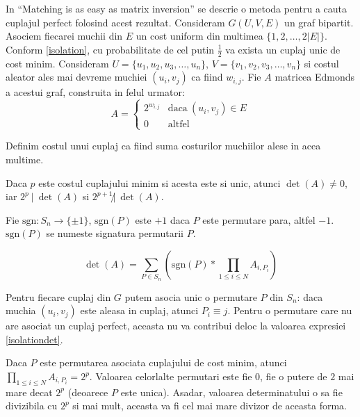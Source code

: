 In ``Matching is as easy as matrix inversion'' \cite{matchingezmatrix} se
descrie o metoda pentru a cauta cuplajul perfect folosind acest rezultat.
Consideram $G(U, V, E)$ un graf bipartit. Asociem fiecarei muchii din $E$ un
cost uniform din multimea $\{1, 2, \ldots, 2|E|\}$. Conform \ref{isolation}, cu
probabilitate de cel putin $\frac{1}{2}$ va exista un cuplaj unic de cost minim.
Consideram $U = \{u_{1}, u_{2}, u_{3}, \ldots, u_{n}\}$,
$V = \{v_{1}, v_{2}, v_{3}, \ldots, v_{n}\}$ si costul aleator ales mai devreme muchiei
$(u_{i}, v_{j})$ ca fiind $w_{i,j}$. Fie $A$ matricea Edmonds a acestui
graf, construita in felul urmator:
\begin{equation}
A=
\begin{cases}
  2^{w_{i,j}} & \text{daca}\ (u_{i}, v_{j}) \in E \\
  0 & \text{altfel}
\end{cases}
\end{equation}

Definim costul unui cuplaj ca fiind suma costurilor muchiilor alese in acea multime.
\begin{lem}
  Daca $p$ este costul cuplajului minim si acesta este si unic, atunci $\det(A) \neq 0$, iar
  $2^{p} \ |\ \det(A)$ si $2^{p+1} \not| \ \det(A)$.
\end{lem}

Fie $\text{sgn} : S_{n} \to \{\pm 1\}$, $\text{sgn}(P)$ este $+1$ daca $P$
este permutare para, altfel $-1$. $\text{sgn}(P)$ se numeste signatura
permutarii $P$.

\begin{equation}
  \label{isolationdet}
  \det(A) = \displaystyle\sum\limits_{P \in S_{n}} (\text{sgn}(P) * \prod_{1 \leq i \leq N} A_{i, P_{i}})
\end{equation}

Pentru fiecare cuplaj din $G$ putem asocia unic o permutare $P$ din $S_{n}$:
daca muchia $(u_{i}, v_{j})$ este aleasa in cuplaj, atunci $P_{i} \equiv j$.
Pentru o permutare care nu are asociat un cuplaj perfect, aceasta nu va
contribui deloc la valoarea expresiei \ref{isolationdet}. \par

Daca $P$ este permutarea asociata cuplajului de cost minim, atunci
$\prod_{1 \leq i \leq N} A_{i, P_{i}} = 2^{p}$. Valoarea celorlalte permutari
este fie $0$, fie o putere de $2$ mai mare decat $2^{p}$ (deoarece $P$ este
unica). Asadar, valoarea determinatului o sa fie divizibila cu $2^{p}$ si
mai mult, aceasta va fi cel mai mare divizor de aceasta forma.

